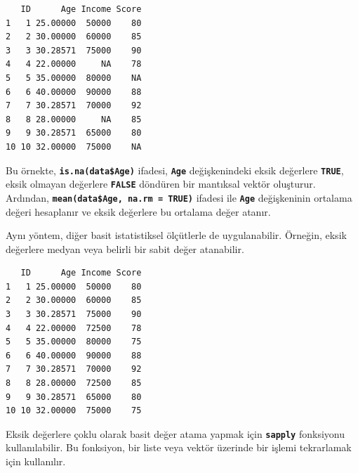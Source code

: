 \documentclass[
  letterpaper,
  DIV=11,
  numbers=noendperiod]{scrreprt}
\newenvironment{Shaded}{\begin{snugshade}}{\end{snugshade}}
\newcommand{\AttributeTok}[1]{\textcolor[rgb]{0.40,0.45,0.13}{#1}}
\newcommand{\CommentTok}[1]{\textcolor[rgb]{0.37,0.37,0.37}{#1}}
\newcommand{\ConstantTok}[1]{\textcolor[rgb]{0.56,0.35,0.01}{#1}}
\newcommand{\DecValTok}[1]{\textcolor[rgb]{0.68,0.00,0.00}{#1}}
\newcommand{\FunctionTok}[1]{\textcolor[rgb]{0.28,0.35,0.67}{#1}}
\newcommand{\NormalTok}[1]{\textcolor[rgb]{0.00,0.23,0.31}{#1}}
\newcommand{\OtherTok}[1]{\textcolor[rgb]{0.00,0.23,0.31}{#1}}
\newcommand{\SpecialCharTok}[1]{\textcolor[rgb]{0.37,0.37,0.37}{#1}}
\begin{document}
\begin{verbatim}
   ID      Age Income Score
1   1 25.00000  50000    80
2   2 30.00000  60000    85
3   3 30.28571  75000    90
4   4 22.00000     NA    78
5   5 35.00000  80000    NA
6   6 40.00000  90000    88
7   7 30.28571  70000    92
8   8 28.00000     NA    85
9   9 30.28571  65000    80
10 10 32.00000  75000    NA
\end{verbatim}

Bu örnekte, \textbf{\texttt{is.na(data\$Age)}} ifadesi,
\textbf{\texttt{Age}} değişkenindeki eksik değerlere
\textbf{\texttt{TRUE}}, eksik olmayan değerlere \textbf{\texttt{FALSE}}
döndüren bir mantıksal vektör oluşturur. Ardından,
\textbf{\texttt{mean(data\$Age,\ na.rm\ =\ TRUE)}} ifadesi ile
\textbf{\texttt{Age}} değişkeninin ortalama değeri hesaplanır ve eksik
değerlere bu ortalama değer atanır.

Aynı yöntem, diğer basit istatistiksel ölçütlerle de uygulanabilir.
Örneğin, eksik değerlere medyan veya belirli bir sabit değer atanabilir.

\begin{Shaded}
\end{Shaded}

\begin{verbatim}
   ID      Age Income Score
1   1 25.00000  50000    80
2   2 30.00000  60000    85
3   3 30.28571  75000    90
4   4 22.00000  72500    78
5   5 35.00000  80000    75
6   6 40.00000  90000    88
7   7 30.28571  70000    92
8   8 28.00000  72500    85
9   9 30.28571  65000    80
10 10 32.00000  75000    75
\end{verbatim}

Eksik değerlere çoklu olarak basit değer atama yapmak için
\textbf{\texttt{sapply}} fonksiyonu kullanılabilir. Bu fonksiyon, bir
liste veya vektör üzerinde bir işlemi tekrarlamak için kullanılır.
\end{document}
